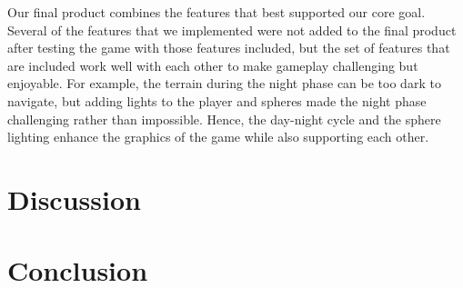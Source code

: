 \documentclass{article}
\begin{document}
Our final product combines the features that best supported our core goal.  Several of the features that we implemented were not added to the final product after testing the game with those features included, but the set of features that are included work well with each other to make gameplay challenging but enjoyable. For example, the terrain during the night phase can be too dark to navigate, but adding lights to the player and spheres made the night phase challenging rather than impossible.  Hence, the day-night cycle and the sphere lighting enhance the graphics of the game while also supporting each other.

%

\section{Discussion}
\section{Conclusion}
\end{document}

